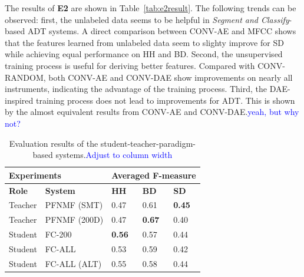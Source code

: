 \documentclass{article}
\newcommand{\comment}[1]{{\textcolor{blue}{#1}}}
\begin{document}
The results of \textbf{E2} are shown in Table~\ref{tab:e2result}. The following trends can be observed: first, the unlabeled data seems to be helpful in \textit{Segment and Classify}-based ADT systems. A direct comparison between CONV-AE and MFCC shows that the features learned from unlabeled data seem to slighty improve for SD while achieving equal performance on HH and BD. Second, the unsupervised training process is useful for deriving better features. Compared with CONV-RANDOM, both CONV-AE and CONV-DAE show improvements on nearly all instruments, indicating the advantage of the training process. Third, the DAE-inspired training process does not lead to improvements for ADT. This is shown by the almost equivalent results from CONV-AE and CONV-DAE.\comment{yeah, but why not?}

\begin{table}[]
\centering
\begin{tabular}{lllll}
\hline
\multicolumn{2}{l}{\textbf{Experiments}}                    & \multicolumn{3}{l}{\textbf{Averaged F-measure}} \\ \hline
\textbf{Role} & \multicolumn{1}{l|}{\textbf{System}}        & \textbf{HH}    & \textbf{BD}    & \textbf{SD}   \\ \hline
Teacher       & \multicolumn{1}{l|}{PFNMF (SMT)}            & 0.47           & 0.61           & \textbf{0.45} \\
Teacher       & \multicolumn{1}{l|}{PFNMF (200D)}           & 0.47           & \textbf{0.67}  & 0.40          \\
Student       & \multicolumn{1}{l|}{FC-200}                & \textbf{0.56}  & 0.57           & 0.44          \\
Student       & \multicolumn{1}{l|}{FC-ALL}               & 0.53           & 0.59           & 0.42          \\
Student       & \multicolumn{1}{l|}{FC-ALL (ALT)} & 0.55           & 0.58           & 0.44          \\ \hline
\end{tabular}
\caption{Evaluation results of the student-teacher-paradigm-based systems.\comment{Adjust to column width}}
\label{tab:e3result}
\end{table}
\end{document}

